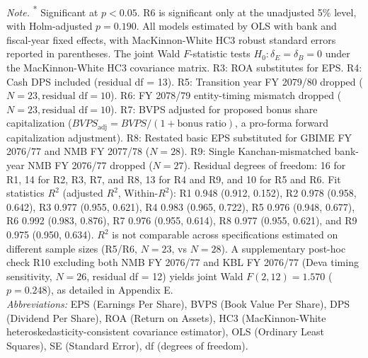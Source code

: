 \vspace{4pt}
{\footnotesize\noindent
\textit{Note.} \textsuperscript{*} Significant at $p < 0.05$. R6 is significant only at the unadjusted 5\% level, with Holm-adjusted $p = 0.190$. All models estimated by OLS with bank and fiscal-year fixed effects, with MacKinnon-White HC3 robust standard errors reported in parentheses. The joint Wald $F$-statistic tests $H_0: \delta_E = \delta_B = 0$ under the MacKinnon-White HC3 covariance matrix. R3: ROA substitutes for EPS. R4: Cash DPS included (residual df = 13). R5: Transition year FY 2079/80 dropped ($N = 23, \text{residual df} = 10$). R6: FY 2078/79 entity-timing mismatch dropped ($N = 23, \text{residual df} = 10$). R7: BVPS adjusted for proposed bonus share capitalization ($\mathit{BVPS}_{\text{adj}} = \mathit{BVPS} / (1 + \text{bonus ratio})$, a pro-forma forward capitalization adjustment). R8: Restated basic EPS substituted for GBIME FY 2076/77 and NMB FY 2077/78 ($N = 28$). R9: Single Kanchan-mismatched bank-year NMB FY 2076/77 dropped ($N = 27$). Residual degrees of freedom: 16 for R1, 14 for R2, R3, R7, and R8, 13 for R4 and R9, and 10 for R5 and R6. Fit statistics $R^2$ (adjusted $R^2$, Within-$R^2$): R1 0.948 (0.912, 0.152), R2 0.978 (0.958, 0.642), R3 0.977 (0.955, 0.621), R4 0.983 (0.965, 0.722), R5 0.976 (0.948, 0.677), R6 0.992 (0.983, 0.876), R7 0.976 (0.955, 0.614), R8 0.977 (0.955, 0.621), and R9 0.975 (0.950, 0.634). $R^2$ is not comparable across specifications estimated on different sample sizes (R5/R6, $N = 23$, vs $N = 28$). A supplementary post-hoc check R10 excluding both NMB FY 2076/77 and KBL FY 2076/77 (Deva timing sensitivity, $N = 26$, residual df = 12) yields joint Wald $F(2,12) = 1.570$ ($p = 0.248$), as detailed in Appendix E. \\
\textit{Abbreviations:} EPS (Earnings Per Share), BVPS (Book Value Per Share), DPS (Dividend Per Share), ROA (Return on Assets), HC3 (MacKinnon-White heteroskedasticity-consistent covariance estimator), OLS (Ordinary Least Squares), SE (Standard Error), df (degrees of freedom).
\par}

